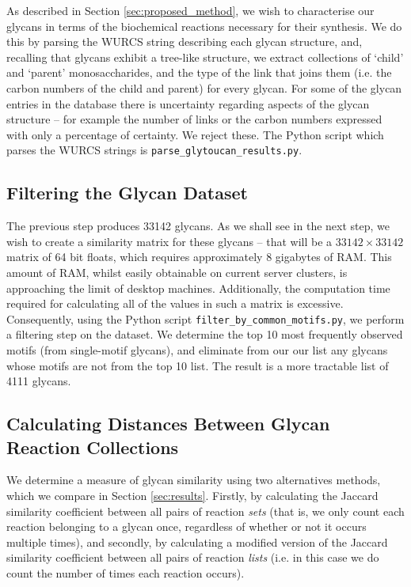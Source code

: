 \documentclass[12pt,a4paper]{article}
\begin{document}
As described in Section \ref{sec:proposed_method}, we wish to characterise our glycans in terms of the biochemical reactions necessary for their synthesis. We do this by parsing the WURCS string describing each glycan structure, and, recalling that glycans exhibit a tree-like structure, we extract collections of `child' and `parent' monosaccharides, and the type of the link that joins them (i.e. the carbon numbers of the child and parent) for every glycan. For some of the glycan entries in the database there is uncertainty regarding aspects of the glycan structure -- for example the number of links or the carbon numbers expressed with only a percentage of certainty. We reject these. The Python script which parses the WURCS strings is \texttt{parse\_glytoucan\_results.py}.

\subsection{Filtering the Glycan Dataset}
\label{sec:filtering_glycans}
The previous step produces 33142 glycans. As we shall see in the next step, we wish to create a similarity matrix for these glycans -- that will be a $33142\times33142$ matrix of 64 bit floats, which requires approximately 8 gigabytes of RAM. This amount of RAM, whilst easily obtainable on current server clusters, is approaching the limit of desktop machines. Additionally, the computation time required for calculating all of the values in such a matrix is excessive. Consequently, using the Python script \texttt{filter\_by\_common\_motifs.py}, we perform a filtering step on the dataset. We determine the top 10 most frequently observed motifs (from single-motif glycans), and eliminate from our our list any glycans whose motifs are not from the top 10 list. The result is a more tractable list of 4111 glycans.


\subsection{Calculating Distances Between Glycan Reaction Collections}
\label{sec:distance_calc_set}

We determine a measure of glycan similarity using two alternatives methods, which we compare in Section \ref{sec:results}. Firstly, by calculating the Jaccard similarity coefficient between all pairs of reaction \emph{sets} (that is, we only count each reaction belonging to a glycan once, regardless of whether or not it occurs multiple times), and secondly, by calculating a modified version of the Jaccard similarity coefficient between all pairs of reaction \emph{lists} (i.e. in this case we do count the number of times each reaction occurs).
\end{document}
